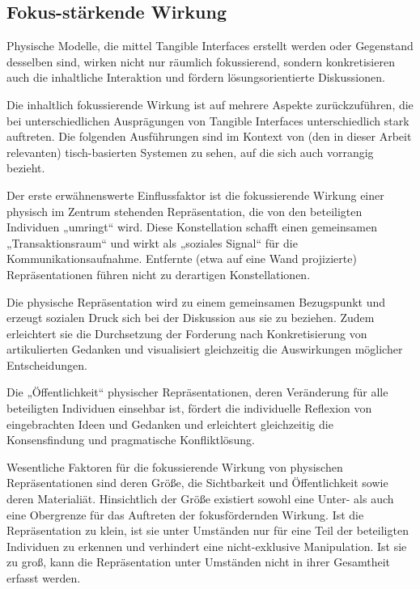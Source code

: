 
\subsection{Fokus-stärkende Wirkung} %
\label{sub:fokus_stärkende_wirkung}

Physische Modelle, die mittel Tangible Interfaces erstellt werden oder Gegenstand desselben sind, wirken nicht nur räumlich fokussierend, sondern konkretisieren auch die inhaltliche Interaktion und fördern lösungsorientierte Diskussionen.

Die inhaltlich fokussierende Wirkung ist auf mehrere Aspekte zurückzuführen, die bei unterschiedlichen Ausprägungen von Tangible Interfaces unterschiedlich stark auftreten. Die folgenden Ausführungen sind im Kontext von (den in dieser Arbeit relevanten) tisch-basierten Systemen zu sehen, auf die sich auch \citet{Hornecker04} vorrangig bezieht.

Der erste erwähnenswerte Einflussfaktor ist die fokussierende Wirkung einer physisch im Zentrum stehenden Repräsentation, die von den beteiligten Individuen „umringt“ wird. Diese Konstellation schafft einen gemeinsamen „Transaktionsraum“ und wirkt als „soziales Signal“ für die Kommunikationsaufnahme. Entfernte (etwa auf eine Wand projizierte) Repräsentationen führen nicht zu derartigen Konstellationen.

Die physische Repräsentation wird zu einem gemeinsamen Bezugspunkt und erzeugt sozialen Druck sich bei der Diskussion aus sie zu beziehen. Zudem erleichtert sie die Durchsetzung der Forderung nach Konkretisierung von artikulierten Gedanken und visualisiert gleichzeitig die Auswirkungen möglicher Entscheidungen.

Die „Öffentlichkeit“ physischer Repräsentationen, deren Veränderung für alle beteiligten Individuen einsehbar ist, fördert die individuelle Reflexion von eingebrachten Ideen und Gedanken und erleichtert gleichzeitig die Konsensfindung und pragmatische Konfliktlösung.

Wesentliche Faktoren für die fokussierende Wirkung von physischen Repräsentationen sind deren Größe, die Sichtbarkeit und Öffentlichkeit sowie deren Materialiät. Hinsichtlich der Größe existiert sowohl eine Unter- als auch eine Obergrenze für das Auftreten der fokusfördernden Wirkung. Ist die Repräsentation zu klein, ist sie unter Umständen nur für eine Teil der beteiligten Individuen zu erkennen und verhindert eine nicht-exklusive Manipulation. Ist sie zu groß, kann die Repräsentation unter Umständen nicht in ihrer Gesamtheit erfasst werden. 

